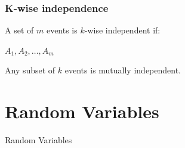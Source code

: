 \documentclass{beamer}
\begin{document}
\begin{frame}
  \frametitle{K-wise independence}

  {\larger
    A set of $m$ events is $k$-wise independent if:

    \bigskip
    
    $A_1, A_2, \ldots, A_m$

    \bigskip

    Any subset of $k$ events is mutually independent.
  }             
\end{frame}

\section{Random Variables}

\begin{frame}
  \begin{centering}
    {\huge
      Random Variables
    }
  \end{centering}
\end{frame}
\end{document}
